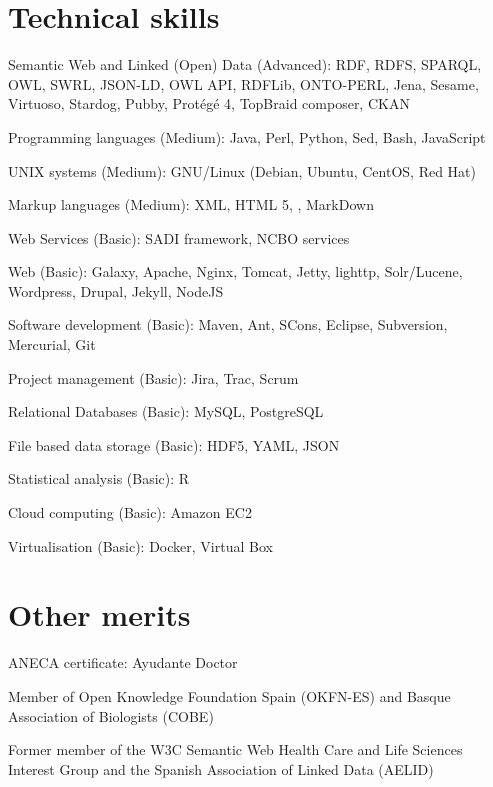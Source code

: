 \documentclass[11pt,fullpage]{article}
\renewenvironment{itemize}{
  \begin{list}{}{
    \setlength{\leftmargin}{1.5em} 
  }  
}{
  \end{list}
}
\begin{document}
\section*{Technical skills}
\begin{itemize}
	\item Semantic Web and Linked (Open) Data (Advanced): RDF, RDFS, SPARQL, OWL, SWRL, JSON-LD, OWL API, RDFLib, ONTO-PERL, Jena, Sesame, Virtuoso, Stardog, Pubby, Prot\'eg\'e 4, TopBraid composer, CKAN
	\item Programming languages (Medium): Java, Perl, Python, Sed, Bash, JavaScript 
	\item UNIX systems (Medium): GNU/Linux (Debian, Ubuntu, CentOS, Red Hat) 
	\item Markup languages (Medium): XML, HTML 5, \LaTeXe, MarkDown
	\item Web Services (Basic): SADI framework, NCBO services
	\item Web (Basic): Galaxy, Apache, Nginx, Tomcat, Jetty, lighttp, Solr/Lucene, Wordpress, Drupal, Jekyll, NodeJS
	\item Software development (Basic): Maven, Ant, SCons, Eclipse, Subversion, Mercurial, Git
	\item Project management (Basic): Jira, Trac, Scrum
	\item Relational Databases (Basic): MySQL, PostgreSQL
	\item File based data storage (Basic): HDF5, YAML, JSON
	\item Statistical analysis (Basic): R
	\item Cloud computing (Basic): Amazon EC2
	\item Virtualisation (Basic): Docker, Virtual Box
\end{itemize}

\section*{Other merits}
\begin{itemize}
	\item ANECA certificate: Ayudante Doctor
	\item Member of Open Knowledge Foundation Spain (OKFN-ES) and Basque Association of Biologists (COBE)
	\item Former member of the W3C Semantic Web Health Care and Life Sciences Interest Group and the Spanish Association of Linked Data (AELID) 
\end{itemize}
\end{document}
